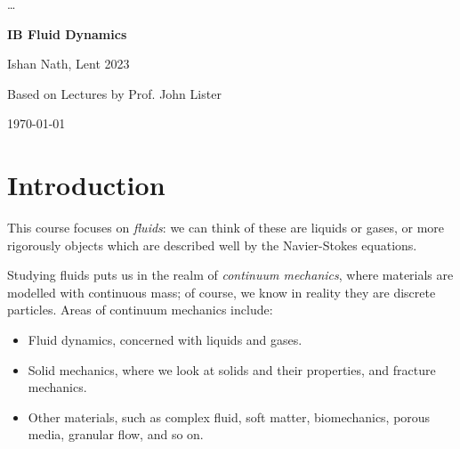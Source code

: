 \documentclass[12pt]{article}
\begin{document}
\robustify\dots
{}


\hypersetup{pageanchor=false}
\begin{titlepage}
	\begin{center}
		\vspace*{1em}
		\Huge
		\textbf{IB Fluid Dynamics}

		\vspace{1em}
		\large
		Ishan Nath, Lent 2023

		\vspace{1.5em}

		\Large

		Based on Lectures by Prof. John Lister

		\vspace{1em}

		\large
		\today
	\end{center}
	
\end{titlepage}
\hypersetup{pageanchor=true}

\tableofcontents

\newpage

\setcounter{section}{-1}

\section{Introduction}
\label{sec:introduction}

This course focuses on \emph{fluids}: we can think of these are liquids or gases, or more rigorously objects which are described well by the Navier-Stokes equations.

Studying fluids puts us in the realm of \emph{continuum mechanics}, where materials are modelled with continuous mass; of course, we know in reality they are discrete particles. Areas of continuum mechanics include:
\begin{itemize}
	\item Fluid dynamics, concerned with liquids and gases.
	\item Solid mechanics, where we look at solids and their properties, and fracture mechanics.
	\item Other materials, such as complex fluid, soft matter, biomechanics, porous media, granular flow, and so on.
\end{itemize}
\end{document}
